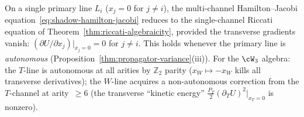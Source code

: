\begin{remark}
\label{rem:hj-riccati-reduction}
On a single primary line $L_i$
\textup{(}$x_j = 0$ for $j \neq i$\textup{)},
the multi-channel Hamilton--Jacobi
equation~\eqref{eq:shadow-hamilton-jacobi}
reduces to the single-channel Riccati equation
of Theorem~\textup{\ref{thm:riccati-algebraicity}},
provided the transverse gradients vanish:
$(\partial U / \partial x_j)|_{x_j = 0} = 0$
for $j \neq i$.
This holds whenever the primary line is
\emph{autonomous}
\textup{(}Proposition~\textup{\ref{thm:propagator-variance}}(iii)\textup{)}.
For the $\cW_3$ algebra: the $T$-line is autonomous
at all arities by $\mathbb{Z}_2$ parity
\textup{(}$x_W \mapsto -x_W$ kills all transverse
derivatives\textup{)};
the $W$-line acquires a
non-autonomous correction from the $T$-channel
at arity~$\geq 6$
\textup{(}the transverse ``kinetic energy''
$\frac{P_T}{2}(\partial_T U)^2\big|_{x_T = 0}$
is nonzero\textup{)}.
\end{remark}

